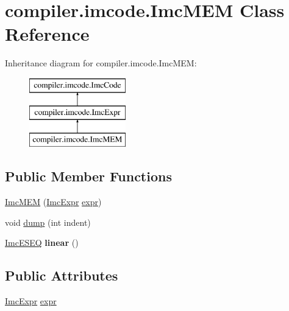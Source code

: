 \hypertarget{classcompiler_1_1imcode_1_1_imc_m_e_m}{}\section{compiler.\+imcode.\+Imc\+M\+EM Class Reference}
\label{classcompiler_1_1imcode_1_1_imc_m_e_m}
Inheritance diagram for compiler.\+imcode.\+Imc\+M\+EM\+:\begin{figure}[H]
\begin{center}
\leavevmode
\includegraphics[height=3.000000cm]{classcompiler_1_1imcode_1_1_imc_m_e_m}
\end{center}
\end{figure}
\subsection*{Public Member Functions}
\begin{DoxyCompactItemize}
\item 
\hyperlink{classcompiler_1_1imcode_1_1_imc_m_e_m_a78a40ab0e139360b2a5898f1a4c31f32}{Imc\+M\+EM} (\hyperlink{classcompiler_1_1imcode_1_1_imc_expr}{Imc\+Expr} \hyperlink{classcompiler_1_1imcode_1_1_imc_m_e_m_a1640644e34627b46dbb785287d6b3869}{expr})
\item 
void \hyperlink{classcompiler_1_1imcode_1_1_imc_m_e_m_a74d96d8a02c82c7d2aa8e2b965d5e557}{dump} (int indent)
\item 
\mbox{\label{classcompiler_1_1imcode_1_1_imc_m_e_m_a16b5f4751320848c74c5955d092ba48d}} 
\hyperlink{classcompiler_1_1imcode_1_1_imc_e_s_e_q}{Imc\+E\+S\+EQ} {\bfseries linear} ()
\end{DoxyCompactItemize}
\subsection*{Public Attributes}
\begin{DoxyCompactItemize}
\item 
\hyperlink{classcompiler_1_1imcode_1_1_imc_expr}{Imc\+Expr} \hyperlink{classcompiler_1_1imcode_1_1_imc_m_e_m_a1640644e34627b46dbb785287d6b3869}{expr}
\end{DoxyCompactItemize}


